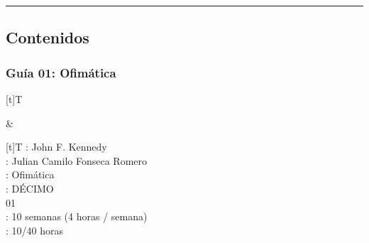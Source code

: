 \documentclass[letterpaper,10pt,spanish]{sphinxmanual}
\begin{document}
\bigskip\hrule\bigskip



\subsection{Contenidos}
\label{\detokenize{cursos/ofimatica10/periodo01/index:contenidos}}
\sphinxstepscope


\subsubsection{Guía 01: Ofimática}
\label{\detokenize{cursos/ofimatica10/periodo01/G01:guia-01-ofimatica}}\label{\detokenize{cursos/ofimatica10/periodo01/G01::doc}}

\begin{savenotes}\sphinxattablestart
\sphinxthistablewithglobalstyle
\centering
\begin{tabular}[t]{}
\sphinxtoprule
\sphinxtableatstartofbodyhook

\begin{savenotes}\sphinxattablestart
\sphinxthistablewithglobalstyle
\centering
\begin{tabulary}{\linewidth}[t]{T}
\sphinxtoprule
\sphinxtableatstartofbodyhook
\sphinxAtStartPar
{}
\\
\sphinxbottomrule
\end{tabulary}
\sphinxtableafterendhook\par
\sphinxattableend\end{savenotes}
&

\begin{savenotes}\sphinxattablestart
\sphinxthistablewithglobalstyle
\centering
\begin{tabulary}{\linewidth}[t]{T}
\sphinxtoprule
\sphinxtableatstartofbodyhook
\sphinxAtStartPar
{}: John F. Kennedy
\\
\sphinxhline
\sphinxAtStartPar
{}: Julian Camilo Fonseca Romero
\\
\sphinxhline
\sphinxAtStartPar
{}: Ofimática
\\
\sphinxhline
\sphinxAtStartPar
{}: DÉCIMO
\\
\sphinxhline
\sphinxAtStartPar
{} 01
\\
\sphinxhline
\sphinxAtStartPar
{}: 10 semanas (4 horas / semana)
\\
\sphinxhline
\sphinxAtStartPar
{}: 10/40 horas
\\
\sphinxbottomrule
\end{tabulary}
\sphinxtableafterendhook\par
\sphinxattableend\end{savenotes}
\\
\sphinxbottomrule
\end{tabular}
\sphinxtableafterendhook\par
\sphinxattableend\end{savenotes}
\end{document}
